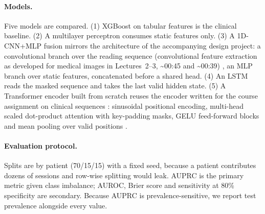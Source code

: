 \documentclass{article}
\begin{document}
\paragraph{Models.} Five models are compared. (1) XGBoost \citep{chen2016xgboost} on tabular features is the clinical baseline. (2) A multilayer perceptron consumes static features only. (3) A 1D-CNN+MLP fusion mirrors the architecture of the accompanying design project: a convolutional branch over the reading
sequence (convolutional feature extraction as developed for medical images in Lectures~2--3, \textasciitilde 00:45 and
\textasciitilde 00:39) \citep{md6329lectures}, an MLP branch over static features, concatenated before a shared head. (4) An LSTM \citep{hochreiter1997lstm} reads the masked sequence and takes the last valid hidden state. (5) A Transformer encoder built from scratch reuses the encoder written for the course assignment on clinical sequences \citep{md6329assignment}: sinusoidal positional encoding, multi-head scaled dot-product attention with key-padding masks, GELU feed-forward blocks and mean pooling over valid positions \citep{vaswani2017attention}.

\paragraph{Evaluation protocol.} Splits are by patient (70/15/15) with a fixed seed, because a patient contributes dozens of sessions and row-wise splitting would leak. AUPRC is the primary metric given class imbalance; AUROC, Brier score and sensitivity at 80\% specificity are secondary. Because AUPRC is prevalence-sensitive, we report test prevalence alongside every value.
\end{document}
